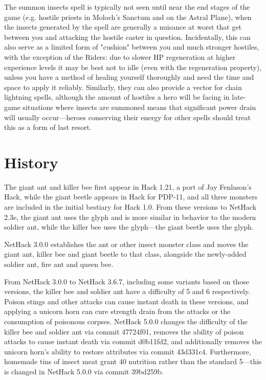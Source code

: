 The summon insects spell is typically not seen until near the end stages of the game (e.g. hostile priests in Moloch's Sanctum and on the Astral Plane), when the insects generated by the spell are generally a nuisance at worst that get between you and attacking the hostile caster in question. Incidentally, this can also serve as a limited form of "cushion" between you and much stronger hostiles, with the exception of the Riders: due to slower HP regeneration at higher experience levels it may be best not to idle (even with the regeneration property), unless you have a method of healing yourself thoroughly and need the time and space to apply it reliably. Similarly, they can also provide a vector for chain lightning spells, although the amount of hostiles a hero will be facing in late-game situations where insects are summoned means that significant power drain will usually occur—heroes conserving their energy for other spells should treat this as a form of last resort.

\section{History}
The giant ant and killer bee first appear in Hack 1.21, a port of Jay Fenlason's Hack, while the giant beetle appears in Hack for PDP-11, and all three monsters are included in the initial bestiary for Hack 1.0. From these versions to NetHack 2.3e, the giant ant uses the \whitesym[A] glyph and is more similar in behavior to the modern soldier ant, while the killer bee uses the \whitesym[k] glyph—the giant beetle uses the \whitesym[b] glyph.

NetHack 3.0.0 establishes the ant or other insect monster class and moves the giant ant, killer bee and giant beetle to that class, alongside the newly-added soldier ant, fire ant and queen bee.

From NetHack 3.0.0 to NetHack 3.6.7, including some variants based on those versions, the killer bee and soldier ant have a difficulty of 5 and 6 respectively. Poison stings and other attacks can cause instant death in these versions, and applying a unicorn horn can cure strength drain from the attacks or the consumption of poisonous corpses. NetHack 5.0.0 changes the difficulty of the killer bee and soldier ant via commit 47724f01, removes the ability of poison attacks to cause instant death via commit d0b11fd2, and additionally removes the unicorn horn's ability to restore attributes via commit 43d331c4. Furthermore, homemade tins of insect meat grant 40 nutrition rather than the standard 5—this is changed in NetHack 5.0.0 via commit 39bd259b.

